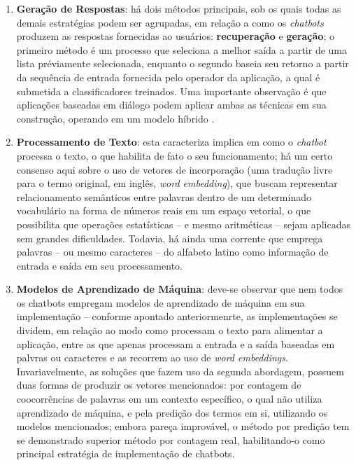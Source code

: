 \begin{enumerate}
    \item \textbf{Geração de Respostas}: há dois métodos principais, sob os quais todas as demais estratégias podem ser agrupadas, em relação a como os \textit{chatbots} produzem as respostas fornecidas ao usuários: \textbf{recuperação} e \textbf{geração}; o primeiro método é um processo que seleciona a melhor saída a partir de uma lista préviamente selecionada, enquanto o segundo baseia seu retorno a partir da sequência de entrada fornecida pelo operador da aplicação, a qual é submetida a classificadores treinados. Uma importante observação é que aplicações baseadas em diálogo podem aplicar ambas as técnicas em sua construção, operando em um modelo híbrido \cite{lokman2018modern}.
    \item \textbf{Processamento de Texto}: esta caracteriza implica em como o \textit{chatbot} processa o texto, o que habilita de fato o seu funcionamento; há um certo consenso aqui sobre o uso de vetores de incorporação (uma tradução livre para o termo original, em inglês, \textit{word embedding}), que buscam representar relacionamento semânticos entre palavras dentro de um determinado vocabulário na forma de números reais em um espaço vetorial, o que possibilita que operações estatísticas -- e mesmo aritméticas -- sejam aplicadas sem grandes dificuldades. Todavia, há ainda uma corrente que emprega palavras -- ou mesmo caracteres -- do alfabeto latino como informação de entrada e saída em seu processamento.
    \item \textbf{Modelos de Aprendizado de Máquina}: deve-se observar que nem todos os chatbots empregam modelos de aprendizado de máquina em sua implementação -- conforme apontado anteriormenrte, as implementações se dividem, em relação ao modo como processam o texto para alimentar a aplicação, entre as que apenas processam a entrada e a saída baseadas em palvras ou caracteres e as recorrem ao uso de \textit{word embeddings}. Invariavelmente, as soluções que fazem uso da segunda abordagem, possuem duas formas de produzir os vetores mencionados: por contagem de coocorrências de palavras em um contexto específico, o qual não utiliza aprendizado de máquina, e pela predição dos termos em si, utilizando os modelos mencionados; embora pareça improvável, o método por predição tem se demonstrado superior método por contagem real, habilitando-o como principal estratégia de implementação de chatbots.
\end{enumerate}


